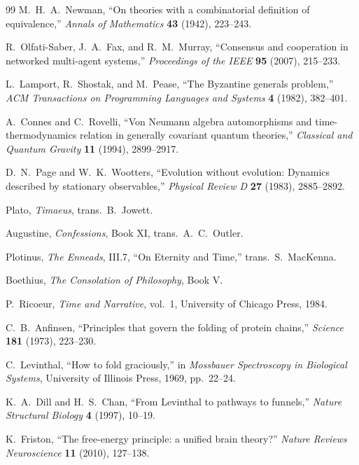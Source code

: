 \documentclass[11pt]{article}
\theoremstyle{remark}
\theoremstyle{plain}
\begin{document}
\begin{thebibliography}{99}
M.\ H.\ A.\ Newman,
``On theories with a combinatorial definition of equivalence,''
\emph{Annals of Mathematics} \textbf{43} (1942), 223--243.

R.\ Olfati-Saber, J.\ A.\ Fax, and R.\ M.\ Murray,
``Consensus and cooperation in networked multi-agent systems,''
\emph{Proceedings of the IEEE} \textbf{95} (2007), 215--233.

L.\ Lamport, R.\ Shostak, and M.\ Pease,
``The Byzantine generals problem,''
\emph{ACM Transactions on Programming Languages and Systems} \textbf{4} (1982), 382--401.

A.\ Connes and C.\ Rovelli,
``Von Neumann algebra automorphisms and time-thermodynamics relation in generally covariant quantum theories,''
\emph{Classical and Quantum Gravity} \textbf{11} (1994), 2899--2917.

D.\ N.\ Page and W.\ K.\ Wootters,
``Evolution without evolution: Dynamics described by stationary observables,''
\emph{Physical Review D} \textbf{27} (1983), 2885--2892.

Plato,
\emph{Timaeus},
trans.\ B.\ Jowett.

Augustine,
\emph{Confessions}, Book XI,
trans.\ A.\ C.\ Outler.

Plotinus,
\emph{The Enneads}, III.7, ``On Eternity and Time,''
trans.\ S.\ MacKenna.

Boethius,
\emph{The Consolation of Philosophy}, Book V.

P.\ Ricoeur,
\emph{Time and Narrative}, vol.\ 1,
University of Chicago Press, 1984.

C.\ B.\ Anfinsen,
``Principles that govern the folding of protein chains,''
\emph{Science} \textbf{181} (1973), 223--230.

C.\ Levinthal,
``How to fold graciously,''
in \emph{Mossbauer Spectroscopy in Biological Systems},
University of Illinois Press, 1969, pp.\ 22--24.

K.\ A.\ Dill and H.\ S.\ Chan,
``From Levinthal to pathways to funnels,''
\emph{Nature Structural Biology} \textbf{4} (1997), 10--19.

K.\ Friston,
``The free-energy principle: a unified brain theory?''
\emph{Nature Reviews Neuroscience} \textbf{11} (2010), 127--138.


\end{thebibliography}
\end{document}
